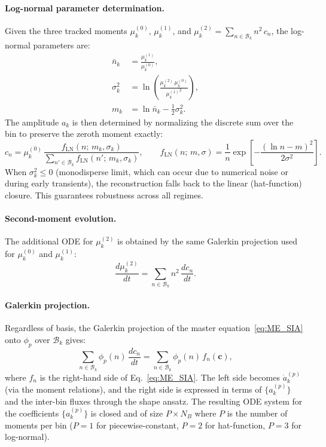 \documentclass[pdflatex,sn-basic]{sn-jnl} %
\begin{document}
\paragraph{Log-normal parameter determination.}
Given the three tracked moments
$\mu_k^{(0)}$, $\mu_k^{(1)}$, and $\mu_k^{(2)} = \sum_{n \in \mathcal{B}_k} n^2\,c_n$,
the log-normal parameters are:
\begin{align}
    \bar{n}_k &= \frac{\mu_k^{(1)}}{\mu_k^{(0)}},
    \label{eq:lognormal_nbar}\\[4pt]
    \sigma_k^2 &= \ln\!\left(\frac{\mu_k^{(2)}\,\mu_k^{(0)}}{{\mu_k^{(1)}}^2}\right),
    \label{eq:lognormal_sigma}\\[4pt]
    m_k &= \ln \bar{n}_k - \tfrac{1}{2}\sigma_k^2.
    \label{eq:lognormal_mk}
\end{align}
The amplitude $a_k$ is then determined by normalizing the discrete sum
over the bin to preserve the zeroth moment exactly:
\begin{equation}\label{eq:lognormal_norm}
    c_n = \mu_k^{(0)}\,
    \frac{f_{\mathrm{LN}}(n;\,m_k,\sigma_k)}
         {\displaystyle\sum_{n' \in \mathcal{B}_k} f_{\mathrm{LN}}(n';\,m_k,\sigma_k)},
    \qquad
    f_{\mathrm{LN}}(n;\,m,\sigma)
      = \frac{1}{n}\exp\!\left[-\frac{(\ln n - m)^2}{2\sigma^2}\right].
\end{equation}
When $\sigma_k^2 \leq 0$ (monodisperse limit, which can occur due to
numerical noise or during early transients), the reconstruction falls
back to the linear (hat-function) closure.  This guarantees robustness
across all regimes.

\paragraph{Second-moment evolution.}
The additional ODE for $\mu_k^{(2)}$ is obtained by the same Galerkin
projection used for $\mu_k^{(0)}$ and $\mu_k^{(1)}$:
\begin{equation}\label{eq:mu2_eq}
    \frac{d\mu_k^{(2)}}{dt}
    = \sum_{n \in \mathcal{B}_k} n^2\,\frac{dc_n}{dt}.
\end{equation}

\paragraph{Galerkin projection.}
Regardless of basis, the Galerkin projection of the master
equation~\eqref{eq:ME_SIA} onto $\phi_p$ over $\mathcal{B}_k$ gives:
\begin{equation}\label{eq:galerkin}
    \sum_{n \in \mathcal{B}_k} \phi_p(n)\,\frac{dc_n}{dt}
    = \sum_{n \in \mathcal{B}_k} \phi_p(n)\,f_n(\mathbf{c}),
\end{equation}
where $f_n$ is the right-hand side of Eq.~\eqref{eq:ME_SIA}. The
left side becomes $\dot{a}_k^{(p)}$ (via the moment relations), and
the right side is expressed in terms of $\{a_k^{(p)}\}$ and the
inter-bin fluxes through the shape ansatz. The resulting ODE system
for the coefficients $\{a_k^{(p)}\}$ is closed and of size
$P \times N_B$ where $P$ is the number of moments per bin ($P = 1$
for piecewise-constant, $P = 2$ for hat-function, $P = 3$ for
log-normal).
\end{document}
